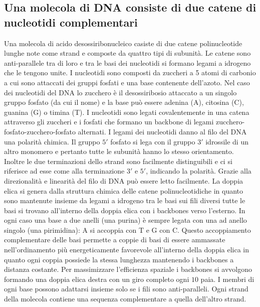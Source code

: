 \subsection{Una molecola di DNA consiste di due catene di nucleotidi complementari}
Una molecola di acido desossiribonucleico casiste di due catene polinucleotide lunghe note come strand e composte da quattro tipi di subunit\`a. Le catene sono anti-parallele tra di loro
e tra le basi dei nucleotidi si formano legami a idrogeno che le tengono unite. I nucleotidi sono composti da zuccheri a 5 atomi di carbonio a cui sono attaccati dei gruppi fosfati e 
una base contenente dell'azoto. Nel caso dei nucleotidi del DNA lo zucchero \`e il desossiribosio attaccato a un singolo gruppo fosfato (da cui il nome) e la base pu\`o essere adenina
(A), citosina (C), guanina (G) o timina (T). I nucleotidi sono legati covalentemente in una catena attraverso gli zuccheri e i fosfati che formano un backbone di legami 
zucchero-fosfato-zucchero-fosfato alternati. I legami dei nucleotidi danno al filo del DNA una polarit\`a chimica. Il gruppo $5'$ fosfato si lega con il gruppo $3'$ idrossile di un
altro monomero e pertanto tutte le subunit\`a hanno lo stesso orientamento. Inoltre le due terminazioni dello strand sono facilmente distinguibili e ci si riferisce ad esse come alla
terminazione $3'$ e $5'$, indicando la polarit\`a. Grazie alla direzionalit\`a e linearit\`a del filo di DNA pu\`o essere letto facilmente. La doppia elica si genera dalla struttura 
chimica delle catene polinucleotidiche in quanto sono mantenute insieme da legami a idrogeno tra le basi sui fili diversi tutte le basi si trovano all'interno della doppia elica con i 
backbones verso l'esterno. In ogni caso una base a due anelli (una purina) \`e sempre legata con una ad anello singolo (una pirimidina): A si accoppia con T e G con C. Questo 
accoppiamento complementare delle basi permette a coppie di basi di essere ammassate nell'ordinamento pi\`u energeticamente favorevole all'interno della doppia elica in quanto ogni
coppia possiede la stessa lunghezza mantenendo i backbones a distanza costante. Per massimizzare l'efficienza spaziale i backbones si avvolgono formando una doppia elica destra con
un giro completo ogni $10$ paia. I membri di ogni base possono adattarsi insieme solo se i fili sono anti-paralleli. Ogni strand della molecola contiene una sequenza complementare a
quella dell'altro strand. 
